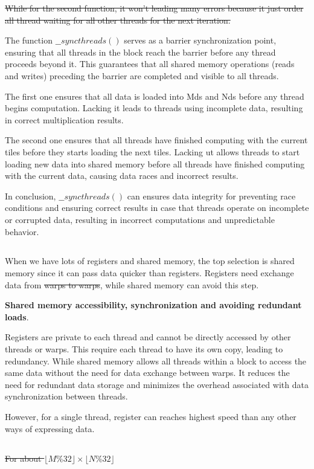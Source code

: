 \documentclass{article}
\begin{document}
\sout{While for the second function, it won't leading many errors because it just order all thread waiting for all other threads for the next iteration.}

The function $\_\_syncthreads()$ serves as a barrier synchronization point, ensuring that all threads in the block reach the barrier before any thread proceeds beyond it. This guarantees that all shared memory operations (reads and writes) preceding the barrier are completed and visible to all threads.

The first one ensures that all data is loaded into Mds and Nds before any thread begins computation. Lacking it leads to threads using incomplete data, resulting in correct multiplication results.

The second one ensures that all threads have finished computing with the current tiles before they starts loading the next tiles. Lacking ut allows threads to start loading new data into shared memory before all threads have finished computing with the current data, causing data races and incorrect results.

In conclusion, $\_\_syncthreads()$ can ensures data integrity for preventing race conditions and ensuring correct results in case that threads operate on incomplete or corrupted data, resulting in incorrect computations and unpredictable behavior.

\subsection{}
When we have lots of registers and shared memory, the top selection is shared memory since it can pass data quicker than registers. Registers need exchange data from \sout{warps to warps}, while shared memory can avoid this step.

\textbf{Shared memory accessibility, synchronization and avoiding redundant loads}.

Registers are private to each thread and cannot be directly accessed by other threads or warps. This require each thread to have its own copy, leading to redundancy. While shared memory allows all threads within a block to access the same data without the need for data exchange between warps. It reduces the need for redundant data storage and minimizes the overhead associated with data synchronization between threads.

However, for a single thread, register can reaches highest speed than any other ways of expressing data.

\subsection{}
\sout{For about $\lfloor M\%32 \rfloor \times \lfloor N\%32 \rfloor$}
\end{document}
